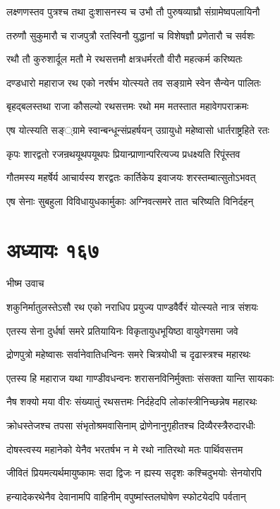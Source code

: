 \twolineshloka
{लक्ष्णणस्तव पुत्रश्च तथा दुःशासनस्य च}
{उभौ तौ पुरुषव्याघ्रौ संग्रामेष्वपलायिनौ}


\twolineshloka
{तरुणौ सुकुमारौ च राजपुत्रौ रतस्विनौ}
{युद्धानां च विशेषज्ञौ प्रणेतारौ च सर्वशः}


\twolineshloka
{रथौ तौ कुरुशार्दूल मतौ मे रथसत्तमौ}
{क्षत्रधर्मरतौ वीरौ महत्कर्म करिष्यतः}


\twolineshloka
{दण्डधारो महाराज रथ एको नरर्षभ}
{योत्स्यते तव सङ्ग्रामे स्वेन सैन्येन पालितः}


\twolineshloka
{बृहद्बलस्तथा राजा कौसल्यो रथसत्तमः}
{रथो मम मतस्तात महावेगपराक्रमः}


\twolineshloka
{एष योत्स्यति सङ््ग्रामे स्वान्बन्धून्संप्रहर्षयन्}
{उग्रायुधो महेष्वासो धार्तराष्ट्रहिते रतः}


\twolineshloka
{कृपः शारद्वतो रजन्रथयूथपयूथपः}
{प्रियान्प्राणान्परित्यज्य प्रधक्ष्यति रिपूंस्तव}


\twolineshloka
{गौतमस्य महर्षेर्य आचार्यस्य शरद्वतः}
{कार्तिकेय इवाजयः शरस्तम्बात्सुतोऽभवत्}


\twolineshloka
{एष सेनाः सुबहुला विविधायुधकार्मुकाः}
{अग्निवत्समरे तात चरिष्यति विनिर्दहन्}


\chapter{अध्यायः १६७}
\twolineshloka
{भीष्म उवाच}
{}


\twolineshloka
{शकुनिर्मातुलस्तेऽसौ रथ एको नराधिप}
{प्रयुज्य पाण्डवैर्वैरं योत्स्यते नात्र संशयः}


\twolineshloka
{एतस्य सेना दुर्धर्षा समरे प्रतियायिनः}
{विकृतायुधभूयिष्ठा वायुवेगसमा जवे}


\twolineshloka
{द्रोणपुत्रो महेष्वासः सर्वानेवातिधन्विनः}
{समरे चित्रयोधी च दृढास्त्रश्च महारथः}


\twolineshloka
{एतस्य हि महाराज यथा गाण्डीवधन्वनः}
{शरासनविनिर्मुक्ताः संसक्ता यान्ति सायकाः}


\twolineshloka
{नैष शक्यो मया वीरः संख्यातुं रथसत्तमः}
{निर्दहेदपि लोकांस्त्रीनिच्छन्नेष महारथः}


\twolineshloka
{क्रोधस्तेजश्च तपसा संभृतोश्रमवासिनाम्}
{द्रोणेनानुगृहीतश्च दिव्यैरस्त्रैरुदारधीः}


\twolineshloka
{दोषस्त्वस्य महानेको येनैव भरतर्षभ}
{न मे रथो नातिरथो मतः पार्थिवसत्तम}


\twolineshloka
{जीवितं प्रियमत्यर्थमायुष्कामः सदा द्विजः}
{न ह्यस्य सदृशः कश्चिदुभयोः सेनयोरपि}


\twolineshloka
{हन्यादेकरथेनैव देवानामपि वाहिनीम्}
{वपुष्मांस्तलघोषेण स्फोटयेदपि पर्वतान्}


